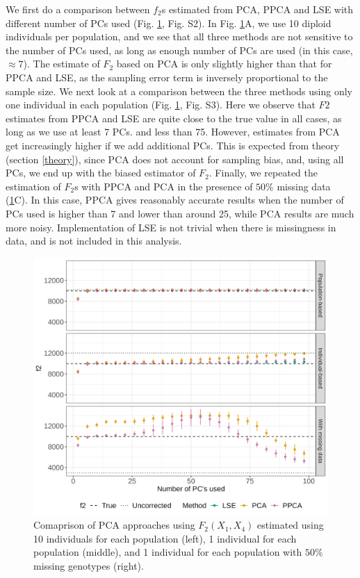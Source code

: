 \documentclass[12pt, letterpaper]{article}
\begin{document}
We first do a comparison between $f_2$s estimated from PCA, PPCA and LSE with different number of PCs used (Fig. \ref{fig:comparison}, Fig. S2). In Fig. \ref{fig:comparison}A, we use 10 diploid individuals per population, and we see that all three methods are not sensitive to the number of  PCs used, as long as enough number of PCs are used (in this case, $\approx 7$). The estimate of $F_2$ based on PCA is only slightly higher than that for PPCA and LSE, as the sampling error term is inversely proportional to the sample size. We next look at a comparison between the three methods using only one individual in each population (Fig. \ref{fig:comparison}, Fig. S3). Here we observe that $F2$ estimates from PPCA and LSE are quite close to the true value in all cases, as long as we use at least 7 PCs. and less than 75. However, estimates from PCA get increasingly higher if we add additional PCs. This is expected from theory (section \ref{theory}), since PCA does not account for sampling bias, and, using all PCs, we end up with the biased estimator of $F_2$. Finally, we repeated the estimation of $F_2$s with PPCA and PCA in the presence of $50\%$ missing data (\ref{fig:comparison}C). In this case, PPCA gives reasonably accurate results when the number of PCs used is higher than 7 and lower than around 25, while PCA results are much more noisy. Implementation of LSE is not trivial when there is missingness in data, and is not included in this analysis. 


\begin{figure}[ht!]
    \includegraphics[width=16.5cm]{plots/simfiles_Ne1000_split_times1000/npop10_nind100/missing0.5/mu0.05_main_fig_all_pca.png}
    \centering
    \caption{Comaprison of PCA approaches using $F_2(X_1,X_4)$ estimated using 10 individuals for each population (left), 1 individual for each population (middle), and 1 individual for each population with $50\%$ missing genotypes (right).}
    \label{fig:comparison}
\end{figure}
\end{document}
